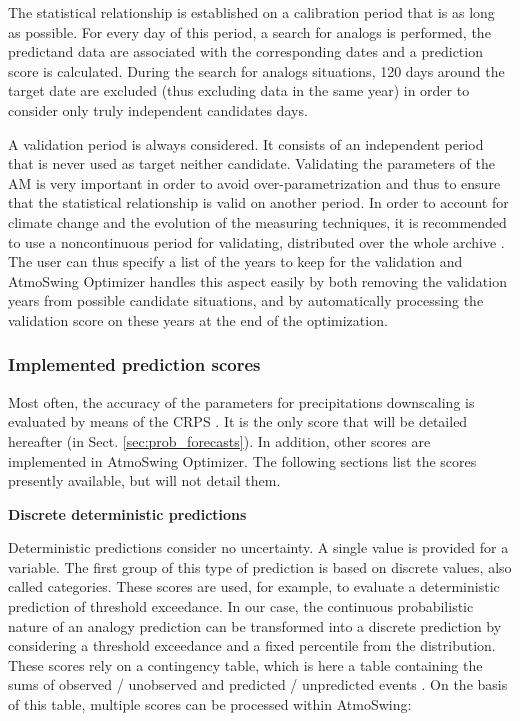 \documentclass[review]{elsarticle}
\begin{document}
The statistical relationship is established on a calibration period that is as long as possible. For every day of this period, a search for analogs is performed, the predictand data are associated with the corresponding dates and a prediction score is calculated. During the search for analogs situations, 120 days around the target date are excluded (thus excluding data in the same year) in order to consider only truly independent candidates days.

A validation period is always considered. It consists of an independent period that is never used as target neither candidate. Validating the parameters of the AM is very important in order to avoid over-parametrization and thus to ensure that the statistical relationship is valid on another period. In order to account for climate change and the evolution of the measuring techniques, it is recommended to use a noncontinuous period for validating, distributed over the whole archive \citep{BenDaoud2010}. The user can thus specify a list of the years to keep for the validation and AtmoSwing Optimizer handles this aspect easily by both removing the validation years from possible candidate situations, and by automatically processing the validation score on these years at the end of the optimization.


\subsubsection{Implemented prediction scores}
\label{sec:forecasts-scores}

Most often, the accuracy of the parameters for precipitations downscaling is evaluated by means of the CRPS \citep[Continuous Ranked Probability Score,][]{Brown1974, Matheson1976, Hersbach2000}. It is the only score that will be detailed hereafter (in Sect. \ref{sec:prob_forecasts}). In addition, other scores are implemented in AtmoSwing Optimizer. The following sections list the scores presently available, but will not detail them.


\textbf{Discrete deterministic predictions}

Deterministic predictions consider no uncertainty. A single value is provided for a variable. The first group of this type of prediction is based on discrete values, also called categories. These scores are used, for example, to evaluate a deterministic prediction of threshold exceedance. In our case, the continuous probabilistic nature of an analogy prediction can be transformed into a discrete prediction by considering a threshold exceedance and a fixed percentile from the distribution. These scores rely on a contingency table, which is here a table containing the sums of observed / unobserved and predicted / unpredicted events \citep{Wilks2006}. On the basis of this table, multiple scores can be processed within AtmoSwing:
\end{document}
